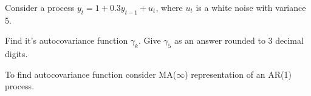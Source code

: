 
\begin{question}
Consider a process \(y_t = 1 + 0.3 y_{t-1} + u_t\), where \(u_t\) is a white noise with variance 5.

Find it's autocovariance function \(\gamma_k\). Give \(\gamma_5\) as an answer rounded to 3 decimal digits.
\end{question}

\begin{solution}
To find autocovariance function consider MA(\(\infty\)) representation of an AR(1) process.
\end{solution}


